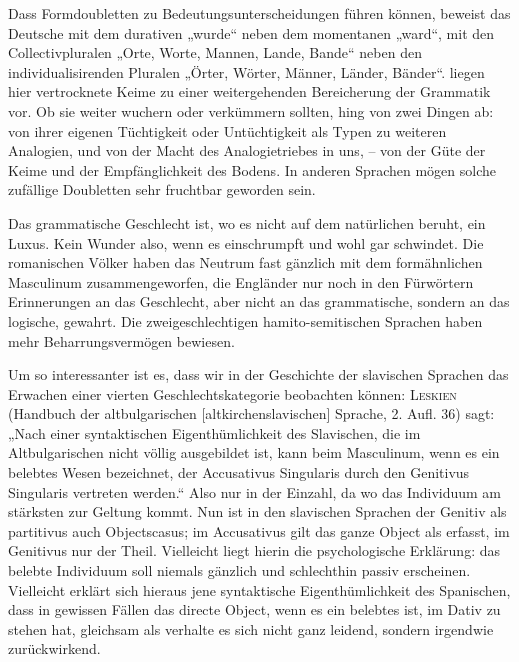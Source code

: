 {Dass Formdoubletten zu Bedeutungsunterscheidungen führen können, beweist das Deutsche mit dem durativen „wurde“ neben dem momentanen „ward“, mit den Collectivpluralen „Orte, Worte, Mannen, Lande, Bande“ neben den individualisirenden Pluralen „Örter, Wörter, Männer, Länder, Bänder“.  liegen hier vertrocknete Keime zu einer weitergehenden Bereicherung der Grammatik vor. Ob sie weiter wuchern oder verkümmern sollten, hing von zwei Dingen ab: von ihrer eigenen \label{fp.249} Tüchtigkeit oder Untüchtigkeit als Typen zu weiteren Analogien, und von der Macht des Analogietriebes in uns, – von der Güte der Keime und der Empfänglichkeit des Bodens. In anderen Sprachen mögen solche zufällige Doubletten sehr fruchtbar geworden sein.

Das grammatische Geschlecht ist, wo es nicht auf dem natürlichen beruht, ein Luxus. Kein Wunder also, wenn es einschrumpft und wohl gar schwindet. Die romanischen Völker haben das Neutrum fast gänzlich mit dem formähnlichen Masculinum zusammengeworfen, die Engländer nur noch in den Fürwörtern Erinnerungen an das Geschlecht, aber nicht an das grammatische, sondern an das logische, gewahrt. Die zweigeschlechtigen hamito-semitischen Sprachen haben  mehr Beharrungsvermögen bewiesen.

Um so interessanter ist es, dass wir in der Geschichte der slavischen Sprachen das Erwachen einer vierten Geschlechtskategorie beobachten können: \textsc{Leskien} (Handbuch der altbulgarischen [altkirchenslavischen] Sprache, 2. Aufl.  36) sagt: „Nach einer syntaktischen Eigenthümlichkeit des Slavischen, die im Altbulgarischen nicht völlig ausgebildet ist, kann beim Masculinum, wenn es ein belebtes Wesen bezeichnet, der Accusativus Singularis durch den Genitivus Singularis vertreten werden.“ Also nur in der Einzahl, da wo das Individuum am stärksten zur Geltung kommt. Nun ist in den slavischen Sprachen der Genitiv als partitivus auch Objectscasus; im Accusativus gilt das ganze Object als erfasst, im Genitivus nur der Theil. Vielleicht liegt hierin die psychologische Erklärung: das belebte Individuum soll niemals gänzlich und schlechthin passiv erscheinen. Vielleicht erklärt sich hieraus jene syntaktische Eigenthüm\-\label{sp.255}lichkeit des Spanischen, dass in gewissen Fällen das directe Object, wenn es ein belebtes ist, im Dativ zu stehen hat, gleichsam als verhalte es sich nicht ganz leidend, sondern irgendwie zurückwirkend.

}
